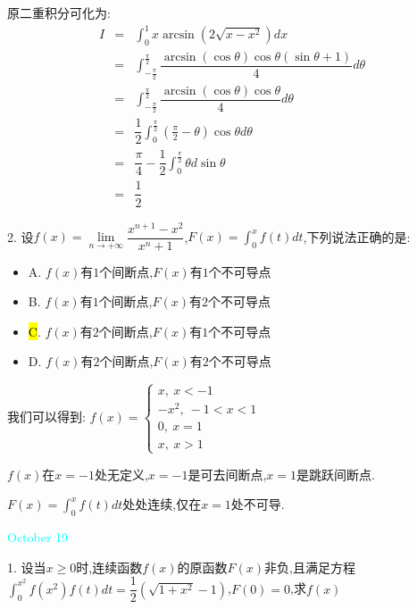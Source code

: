 \begin{solution}

	原二重积分可化为:  
	\begin{eqnarray*}
		I&=&\int_{0}^{1}x\arcsin(2\sqrt{x-x^2})dx\\
		&=&\int_{-\frac{\pi}{2}}^{\frac{\pi}{2}}\dfrac{\arcsin(\cos\theta) \cos\theta(\sin\theta+1)}{4}d\theta\\
		&=&\int_{-\frac{\pi}{2}}^{\frac{\pi}{2}}\dfrac{\arcsin(\cos\theta)\cos\theta}{4}d\theta\\
		&=&\dfrac{1}{2}\int_{0}^{\frac{\pi}{2}}(\frac{\pi}{2}-\theta)\cos\theta d\theta\\
		&=&\dfrac{\pi}{4}-\dfrac{1}{2}\int_{0}^{\frac{\pi}{2}}\theta d\sin\theta\\
		&=&\dfrac{1}{2}
	\end{eqnarray*}
\end{solution}


2. 设$f(x)=\lim\limits_{n\to+\infty}\dfrac{x^{n+1}-x^2}{x^n+1}$,$F(x)=\int_{0}^{x}f(t)dt$,下列说法正确的是:  
\begin{itemize}
	\item A. $f(x)$有$1$个间断点,$F(x)$有$1$个不可导点
	\item B. $f(x)$有$1$个间断点,$F(x)$有$2$个不可导点
	\item \hl{C}. $f(x)$有$2$个间断点,$F(x)$有$1$个不可导点
	\item D. $f(x)$有$2$个间断点,$F(x)$有$2$个不可导点
\end{itemize}

\begin{solution}

	我们可以得到:  $f(x)=\left\lbrace
	\begin{array}{l}
		x,\ x<-1\\
		-x^2,\ -1<x<1\\
		0,\ x=1\\
		x,\ x>1
	\end{array}
	\right. $
	
	$f(x)$在$x=-1$处无定义,$x=-1$是可去间断点,$x=1$是跳跃间断点.
	
	$F(x)=\int_{0}^{x}f(t)dt$处处连续,仅在$x=1$处不可导.
\end{solution}


\textcolor{cyan}{October 19}

1. 设当$x\geq 0$时,连续函数$f(x)$的原函数$F(x)$非负,且满足方程$\int_{0}^{x^2}f(x^2)f(t)dt=\dfrac{1}{2}(\sqrt{1+x^2}-1)$,$F(0)=0$,求$f(x)$

